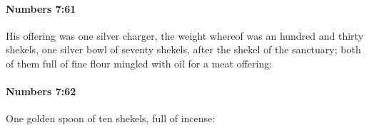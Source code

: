 		\paragraph{Numbers 7:61} %
			\label{NUMBERS-7-61}

			His offering was one silver charger, the weight whereof was an hundred and thirty shekels, one silver bowl of seventy shekels, after the shekel of the sanctuary; both of them full of fine flour mingled with oil for a meat offering:


		\paragraph{Numbers 7:62} %
			\label{NUMBERS-7-62}

			One golden spoon of ten shekels, full of incense:


